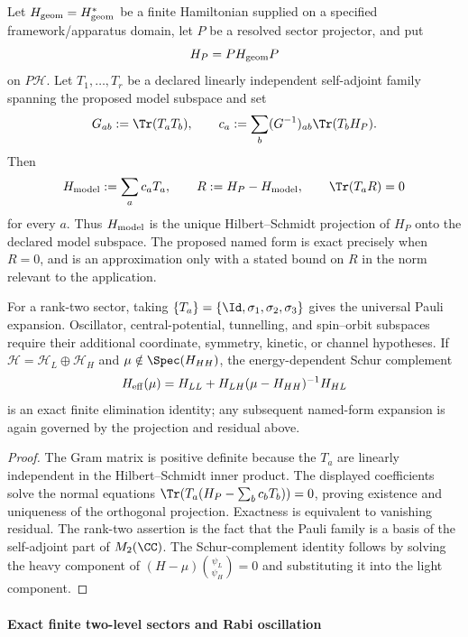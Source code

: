 \documentclass[12pt,a4paper]{article}
\begin{document}
\begin{theorem}
\label{p4:thm:worked-hamiltonian-coefficients-derived}
Let \(H_{\rm geom}=H_{\rm geom}^*\) be a finite Hamiltonian supplied on a
specified framework/apparatus domain, let \(P\) be a resolved sector projector,
and put
\[
  H_P=P H_{\rm geom}P
\]
on \(P\mathcal H\).  Let \(T_1,\ldots,T_r\) be a declared linearly independent
self-adjoint family spanning the proposed model subspace and set
\[
G_{ab}:=\Tr(T_aT_b),
\qquad
c_a:=\sum_b(G^{-1})_{ab}\Tr(T_bH_P).
\]
Then
\[
H_{\rm model}:=\sum_a c_aT_a,
\qquad
R:=H_P-H_{\rm model},
\qquad
\Tr(T_aR)=0
\]
for every \(a\).  Thus \(H_{\rm model}\) is the unique Hilbert--Schmidt
projection of \(H_P\) onto the declared model subspace.  The proposed named
form is exact precisely when \(R=0\), and is an approximation only with a
stated bound on \(R\) in the norm relevant to the application.

For a rank-two sector, taking
\(\{T_a\}=\{\Id,\sigma_1,\sigma_2,\sigma_3\}\) gives the universal Pauli
expansion.  Oscillator, central-potential, tunnelling, and spin--orbit
subspaces require their additional coordinate, symmetry, kinetic, or channel
hypotheses.  If
\(\mathcal H=\mathcal H_L\oplus\mathcal H_H\) and
\(\mu\notin\Spec(H_{HH})\), the energy-dependent Schur complement
\[
H_{\rm eff}(\mu)
=H_{LL}+H_{LH}(\mu-H_{HH})^{-1}H_{HL}
\]
is an exact finite elimination identity; any subsequent named-form expansion
is again governed by the projection and residual above.
\end{theorem}

\begin{proof}
The Gram matrix is positive definite because the \(T_a\) are linearly
independent in the Hilbert--Schmidt inner product.  The displayed coefficients
solve the normal equations
\(\Tr(T_a(H_P-\sum_bc_bT_b))=0\), proving existence and uniqueness of the
orthogonal projection.  Exactness is equivalent to vanishing residual.  The
rank-two assertion is the fact that the Pauli family is a basis of the
self-adjoint part of \(M_2(\CC)\).  The Schur-complement identity follows by
solving the heavy component of
\((H-\mu)\binom{\psi_L}{\psi_H}=0\) and substituting it into the light
component.
\end{proof}



\paragraph{Exact finite two-level sectors and Rabi oscillation}
\label{p4:sec:part2-rabi}
\end{document}
